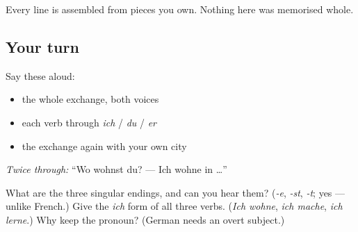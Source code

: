Every line is assembled from pieces you own. Nothing here was memorised whole.

\subsection*{Your turn}
Say these aloud:

\begin{itemize}
\raggedright
  \item the whole exchange, both voices
  \item each verb through \emph{ich} / \emph{du} / \emph{er}
  \item the exchange again with your own city
\end{itemize}

\emph{Twice through:} \textquotedblleft{}Wo wohnst du? — Ich wohne in …\textquotedblright{}

\begin{tcolorbox}[breakable,colback=teal!4,colframe=teal!35!black,title={Before you move on}]
What are the three singular endings, and can you hear them? (\emph{-e}, \emph{-st}, \emph{-t}; yes — unlike French.) Give the \emph{ich} form of all three verbs. (\emph{Ich wohne}, \emph{ich mache}, \emph{ich lerne}.) Why keep the pronoun? (German needs an overt subject.)
\end{tcolorbox}
